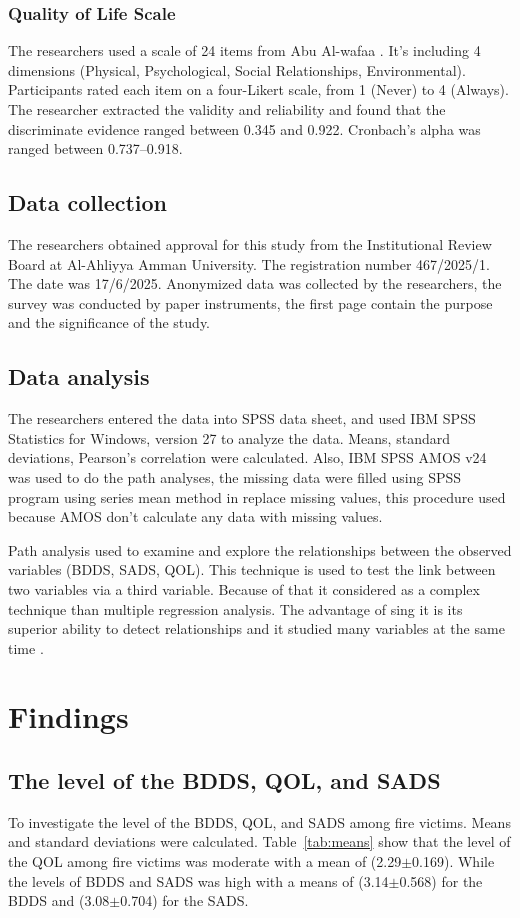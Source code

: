 \documentclass{NSP1}
\begin{document}
\subsubsection{Quality of Life Scale}
The researchers used a scale of 24 items from Abu Al-wafaa \cite{AbuAlwafaa2024}. It's including 4 dimensions (Physical, Psychological, Social Relationships, Environmental). Participants rated each item on a four-Likert scale, from 1 (Never) to 4 (Always). The researcher extracted the validity and reliability and found that the discriminate evidence ranged between 0.345 and 0.922. Cronbach's alpha was ranged between 0.737--0.918.

\subsection{Data collection}
The researchers obtained approval for this study from the Institutional Review Board at Al-Ahliyya Amman University. The registration number 467/2025/1. The date was 17/6/2025. Anonymized data was collected by the researchers, the survey was conducted by paper instruments, the first page contain the purpose and the significance of the study.

\subsection{Data analysis}
The researchers entered the data into SPSS data sheet, and used IBM SPSS Statistics for Windows, version 27 to analyze the data. Means, standard deviations, Pearson's correlation were calculated. Also, IBM SPSS AMOS v24 was used to do the path analyses, the missing data were filled using SPSS program using series mean method in replace missing values, this procedure used because AMOS don't calculate any data with missing values.

Path analysis used to examine and explore the relationships between the observed variables (BDDS, SADS, QOL). This technique is used to test the link between two variables via a third variable. Because of that it considered as a complex technique than multiple regression analysis. The advantage of sing it is its superior ability to detect relationships and it studied many variables at the same time \cite{Garson2014}.

\section{Findings}
\subsection{The level of the BDDS, QOL, and SADS}
To investigate the level of the BDDS, QOL, and SADS among fire victims. Means and standard deviations were calculated. Table~\ref{tab:means} show that the level of the QOL among fire victims was moderate with a mean of (2.29$\pm$0.169). While the levels of BDDS and SADS was high with a means of (3.14$\pm$0.568) for the BDDS and (3.08$\pm$0.704) for the SADS.
\end{document}
